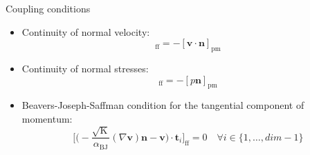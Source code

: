 \documentclass{beamer}
\begin{document}
\begin{frame}{Coupling conditions}
\begin{itemize}
	\item Continuity of normal velocity:
	\begin{equation*}
	[\mathbf{v} \cdot \mathbf{n}]_\text{ff} = - [\mathbf{v} 
	\cdot \mathbf{n}]_\text{pm}
	\end{equation*}
	\item Continuity of normal stresses:
	\begin{equation*}
	[(\varrho \mathbf{v} \mathbf{v}^\mathrm{T} - (\mu + \mu_t) \nabla 
	\mathbf{v} + p\mathbf{I}) 
	\mathbf{n}]_\text{ff} = 
	- [p\mathbf{n}]_\text{pm}
	\end{equation*}
	\item Beavers-Joseph-Saffman condition for the tangential component of 
	momentum:
	\begin{equation*}
	\bigg[ \bigg( -\frac{\sqrt{\mathrm{K}}}{\alpha_\text{BJ}} (\nabla \mathbf{v}) 
	\mathbf{n} - \mathbf{v} \bigg) \cdot \mathbf{t}_i \bigg]_\text{ff} = 0 
	\quad \forall i \in \{1, \dots, dim - 1\}
	\end{equation*}
\end{itemize}
\end{frame}
\end{document}

